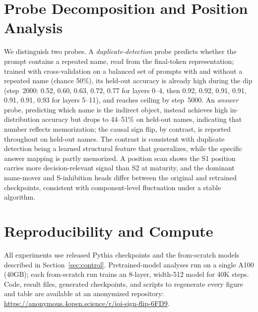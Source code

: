 \documentclass[11pt]{article}
\begin{document}
\section{Probe Decomposition and Position Analysis}
\label{sec:appendix-probe}
We distinguish two probes. A \emph{duplicate-detection} probe predicts whether the prompt contains a repeated name, read from the final-token representation;
trained with cross-validation on a balanced set of prompts with and without a
repeated name (chance 50\%), its held-out
accuracy is already high during the dip (step~2000: 0.52, 0.60, 0.63, 0.72, 0.77
for layers 0--4, then 0.92, 0.92, 0.91, 0.91, 0.91, 0.91, 0.93 for layers 5--11),
and reaches ceiling by step~5000. An \emph{answer} probe, predicting which name
is the indirect object, instead achieves high in-distribution accuracy but drops
to 44--51\% on held-out names, indicating that number reflects memorization;
the causal sign flip, by contrast, is reported throughout on held-out names. The
contrast is consistent with duplicate detection being a learned structural
feature that generalizes, while the specific answer mapping is partly memorized.
A position scan shows the S1 position carries more decision-relevant signal than
S2 at maturity, and the dominant name-mover and S-inhibition heads differ between
the original and retrained checkpoints, consistent with component-level
fluctuation under a stable algorithm.

\section{Reproducibility and Compute}
All experiments use released Pythia checkpoints
\citep{biderman2023pythia} and the from-scratch models described in
Section~\ref{sec:control}. Pretrained-model analyses run on a single A100 (40GB);
each from-scratch run trains an 8-layer, width-512 model for 40K steps. Code,
result files, generated checkpoints, and scripts to regenerate every figure and
table are available at an anonymized repository:
\url{https://anonymous.4open.science/r/ioi-sign-flip-6FD9}.
\end{document}
